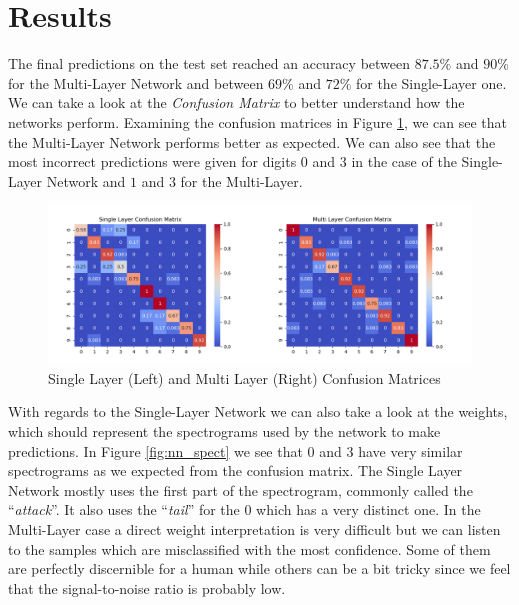 \documentclass[10pt,a4paper]{report}
\begin{document}
\section{Results}
The final predictions on the test set reached an accuracy between $87.5 \%$ and $90 \%$ for the Multi-Layer Network and between $69 \%$ and $72 \%$ for the Single-Layer one. We can take a look at the \textit{Confusion Matrix} to better understand how the networks perform. Examining the confusion matrices in Figure \ref{fig:conf_mat}, we can see that the Multi-Layer Network performs better as expected. We can also see that the most incorrect predictions were given for digits $0$ and $3$ in the case of the Single-Layer Network and $1$ and $3$ for the Multi-Layer. 
\begin{figure}[H]
\centering
\includegraphics[width=0.8\linewidth]{conf_mat.png}
\caption{Single Layer (Left) and Multi Layer (Right) Confusion Matrices}
\label{fig:conf_mat}
\end{figure}
With regards to the Single-Layer Network we can also take a look at the weights, which should represent the spectrograms used by the network to make predictions. In Figure \ref{fig:nn_spect} we see that $0$ and $3$ have very similar spectrograms as we expected from the confusion matrix. The Single Layer Network mostly uses the first part of the spectrogram, commonly called the \enquote{\textit{attack}}. It also uses the \enquote{\textit{tail}} for the $0$ which has a very distinct one. In the Multi-Layer case a direct weight interpretation is very difficult but we can listen to the samples which are misclassified with the most confidence. Some of them are perfectly discernible for a human while others can be a bit tricky since we feel that the signal-to-noise ratio is probably low.
\end{document}
